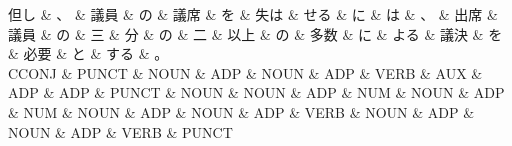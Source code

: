 \documentclass[tikz,border=5pt]{standalone}
\begin{document}
\normalsize
\begin{dependency}[edge unit distance=9.3pt]
    \begin{deptext}[column sep=1em]
        但し \& 、 \& 議員 \& の \& 議席 \& を \& 失は \& せる \& に \& は \& 、 \& 出席 \& 議員 \& の \& 三 \& 分 \& の \& 二 \& 以上 \& の \& 多数 \& に \& よる \& 議決 \& を \& 必要 \& と \& する \& 。\\
        CCONJ \& PUNCT \& NOUN \& ADP \& NOUN \& ADP \& VERB \& AUX \& ADP \& ADP \& PUNCT \& NOUN \& NOUN \& ADP \& NUM \& NOUN \& ADP \& NUM \& NOUN \& ADP \& NOUN \& ADP \& VERB \& NOUN \& ADP \& NOUN \& ADP \& VERB \& PUNCT\\
    \end{deptext}
\end{dependency}
\end{document}

